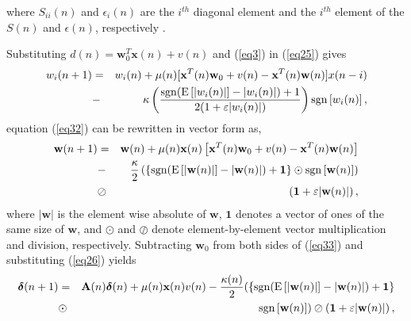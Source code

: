 \noindent where $S_{ii}(n)$ and $\epsilon_{i}(n)$ are the $i^{th}$ diagonal element and the $i^{th}$ element of the $S(n)$ and $\epsilon(n)$, respectively \cite{Salman}.
\par \noindent Substituting $d(n)=\textbf{w}_0^{T}\textbf{x}(n) + v(n)$ and (\ref{eq3}) in (\ref{eq25}) gives
\vspace{-0.1cm}
\begin{eqnarray}
\nonumber
w_{i}(n+1)&=&w_{i}(n)+\mu(n)[\textbf{x}^{T}(n)\textbf{w}_0 + v(n)-\textbf{x}^{T}(n)\textbf{w}(n)]x(n-i)\\
&-& \kappa \left(\frac{\mathrm{sgn}(\mathrm{E}\left[|w_{i}(n)|\right]-|w_{i}(n)|) + 1}{2(1+\varepsilon|w_{i}(n)|)}\right)\mathrm{sgn}\left[w_{i}(n)\right], \label{eq32}\vspace{-0.1cm}
\end{eqnarray}
\noindent equation (\ref{eq32}) can be rewritten in vector form as,
\vspace{-0.1cm}
\begin{eqnarray}
\nonumber
\textbf{w}(n+1)&=& \textbf{w}(n)+\mu(n)\textbf{x}(n)\left[\textbf{x}^{T}(n)\textbf{w}_0 + v(n)-\textbf{x}^{T}(n)\textbf{w}(n)\right]\\
\nonumber
&-&\frac{\kappa}{2} \left(\left\{\mathrm{sgn}(\mathrm{E}\left[|\textbf{w}(n)|\right]-|\textbf{w}(n)|) +\textbf{1}\right\}\odot\mathrm{sgn}\left[\textbf{w}(n)\right]\right)\\
&\oslash& \left(\textbf{1}+\varepsilon|\textbf{w}(n)|\right), \label{eq33}\vspace{-0.1cm}
\end{eqnarray}
\noindent where $|\textbf{w}|$ is the element wise absolute of $\textbf{w}$, $\textbf{1}$ denotes a vector of ones of the same size of $\textbf{w}$, and $\odot$ and $\oslash$ denote element-by-element vector multiplication and division, respectively. Subtracting $\textbf{w}_0$ from both sides of (\ref{eq33}) and substituting (\ref{eq26}) yields
\vspace{-0.1cm}
\begin{eqnarray}
\nonumber
\boldsymbol\delta(n+1)&=& \textbf{A}(n)\boldsymbol\delta(n) + \mu(n)\textbf{x}(n)v(n)-\frac{\kappa(n)}{2} (\left\{\mathrm{sgn}(\mathrm{E}\left[|\textbf{w}(n)|\right]-|\textbf{w}(n)|) +\textbf{1}\right\}\\
&\odot&\mathrm{sgn}\left[\textbf{w}(n)\right])\oslash\left(\textbf{1}+\varepsilon|\textbf{w}(n)|\right), \label{eq34}\vspace{-0.1cm}
\end{eqnarray}

